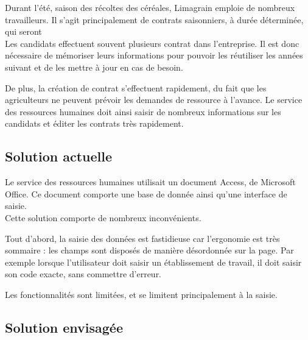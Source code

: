 Durant l'été, saison des récoltes des céréales, Limagrain emploie de nombreux travailleurs.
Il s'agit principalement de contrats saisonniers, à durée déterminée, qui seront 
\\


Les candidats effectuent souvent plusieurs contrat dans l'entreprise.
Il est donc nécessaire de mémoriser leurs informations pour pouvoir les réutiliser les années suivant et de les mettre à jour en cas de besoin.

De plus, la création de contrat s'effectuent rapidement, du fait que les agriculteurs ne peuvent prévoir les demandes de ressource à l'avance.
Le service des ressources humaines doit ainsi saisir de nombreux informations sur les candidats et éditer les contrats très rapidement.




\subsection{Solution actuelle}

Le service des ressources humaines utilisait un document Access, de Microsoft Office.
Ce document comporte une base de donnée ainsi qu'une interface de saisie.
\\


Cette solution comporte de nombreux inconvénients.

Tout d'abord, la saisie des données est fastidieuse car l'ergonomie est très sommaire : les champs sont disposés de manière désordonnée sur la page. Par exemple lorsque l'utilisateur doit saisir un établissement de travail, il doit saisir son code exacte, sans commettre d'erreur.

Les fonctionnalités sont limitées, et se limitent principalement à la saisie.




\subsection{Solution envisagée}

